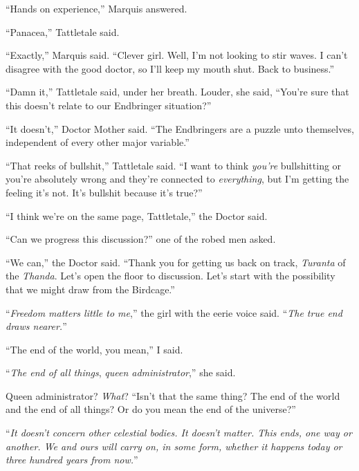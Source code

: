 ``Hands on experience,'' Marquis answered.



``Panacea,'' Tattletale said.



``Exactly,'' Marquis said.  ``Clever girl.  Well, I'm not looking to stir waves.  I can't disagree with the good doctor, so I'll keep my mouth shut.  Back to business.''



``Damn it,'' Tattletale said, under her breath.  Louder, she said, ``You're sure that this doesn't relate to our Endbringer situation?''



``It doesn't,'' Doctor Mother said. ``The Endbringers are a puzzle unto themselves, independent of every other major variable.''



``That reeks of bullshit,'' Tattletale said.  ``I want to think \emph{you're} bullshitting or you're absolutely wrong and they're connected to \emph{everything}, but I'm getting the feeling it's not.  It's bullshit because it's true?''



``I think we're on the same page, Tattletale,'' the Doctor said.



``Can we progress this discussion?'' one of the robed men asked.



``We can,'' the Doctor said.  ``Thank you for getting us back on track, \emph{Turanta} of the \emph{Thanda}.  Let's open the floor to discussion.  Let's start with the possibility that we might draw from the Birdcage.''



``\emph{Freedom matters little to me},'' the girl with the eerie voice said.  ``\emph{The true end draws nearer.}''



``The end of the world, you mean,'' I said.



``\emph{The end of all things}, \emph{queen administrator},'' she said.



Queen administrator?  \emph{What}?  ``Isn't that the same thing?  The end of the world and the end of all things?  Or do you mean the end of the universe?''



``\emph{It doesn't concern other celestial bodies.  It doesn't matter.  This ends, one way or another.  We and ours will carry on, in some form, whether it happens today or three hundred years from now.}''



